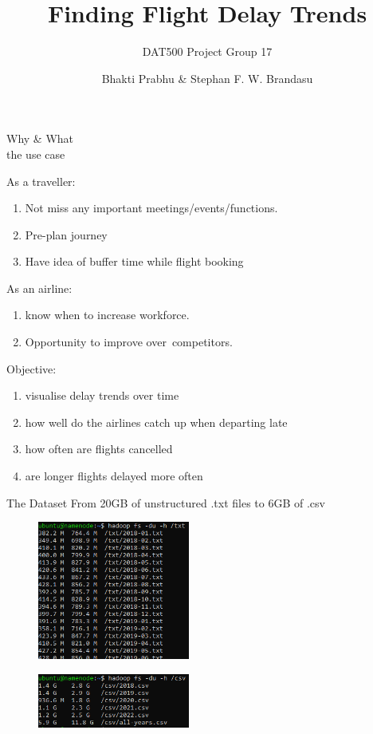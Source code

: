 \documentclass[10pt]{beamer}
\title{Finding Flight Delay Trends}
\subtitle{DAT500 Project Group 17}
\date{}
\author{Bhakti Prabhu \& Stephan F. W. Brandasu}
\institute{Faculty of Science and Technology}
\begin{document}
\maketitle


\begin{frame}{Why \& What\\ \small the use case}
\begin{multicols}{2}
As a traveller: 
\begin{enumerate}
    \item Not miss any important meetings/events/functions.
    \item Pre-plan journey
    \item Have idea of buffer time while flight booking
\end{enumerate}
As an airline:
\begin{enumerate}
    \item  know when to increase workforce.
    \item Opportunity to improve over competitors.
\end{enumerate}
\columnbreak
Objective:
\begin{enumerate}
    \item visualise delay trends over time
    \item how well do the airlines catch up when departing late
    \item how often are flights cancelled
    \item are longer flights delayed more often
\end{enumerate}
\end{multicols}
\end{frame}


\begin{frame}{The Dataset}
From 20GB of unstructured .txt files to 6GB of .csv
\begin{multicols}{2}
\begin{figure}
    \centering
    \includegraphics[width=5cm]{images/unstructured_dataset_size.png}
    \label{fig:unstructured}
\end{figure}
\columnbreak
\begin{figure}
    \centering
    \includegraphics[width=5cm]{images/structured_dataset_size.png}
    \label{fig:structured}
\end{figure}
\end{multicols}
\end{frame}
\end{document}

